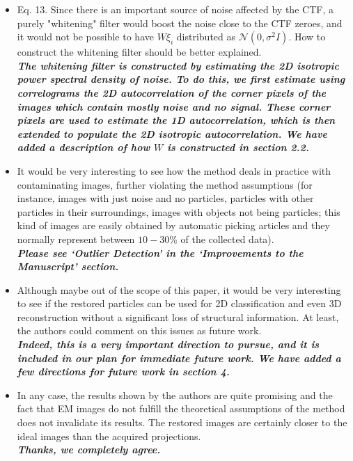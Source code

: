\documentclass{article}
\begin{document}
\begin{itemize}
\item Eq. 13. Since there is an important source of noise affected by the CTF, a 
purely "whitening" filter would boost the noise close to the CTF zeroes, and it 
would not be possible to have $W \xi_i$ distributed as $\mathcal{N}(0,\sigma^2 I)$. How to 
construct the whitening filter should be better explained. \\
\textbf{\textit{The whitening filter is constructed by estimating the 2D isotropic 
power spectral density of noise. To do this, we first estimate using correlograms the 2D autocorrelation
of the corner pixels of the images which contain mostly noise and no signal. These corner
pixels are used to estimate the 1D autocorrelation, which is then extended to populate the 2D isotropic
autocorrelation. We have added a description of how $W$ is constructed in section 2.2.}}

\item It would be very interesting to see how the method deals in practice with 
contaminating images, further violating the method assumptions (for instance, 
images with just noise and no particles, particles with other particles in their 
surroundings, images with objects not being particles; this kind of images are 
easily obtained by automatic picking articles and they normally represent 
between $10-30\%$ of the collected data). \\
\textbf{\textit{Please see `Outlier Detection' in the `Improvements to the Manuscript' section.}}

\item Although maybe out of the scope of this paper, it would be very 
interesting to see if the restored particles can be used for 2D classification 
and even 3D reconstruction without a significant loss of structural information. 
At least, the authors could comment on this issues as future work. \\
\textbf{\textit{Indeed, this is a very important direction to pursue, and it 
is included in our plan for immediate future work.
We have added a few directions for future work in section 4.}}

\item In any case, the results shown by the authors are quite promising and the 
fact that EM images do not fulfill the theoretical assumptions of the method 
does not invalidate its results. The restored images are certainly closer to the 
ideal images than the acquired projections.\\
\textbf{\textit{Thanks, we completely agree.}}
\end{itemize}
\end{document}
